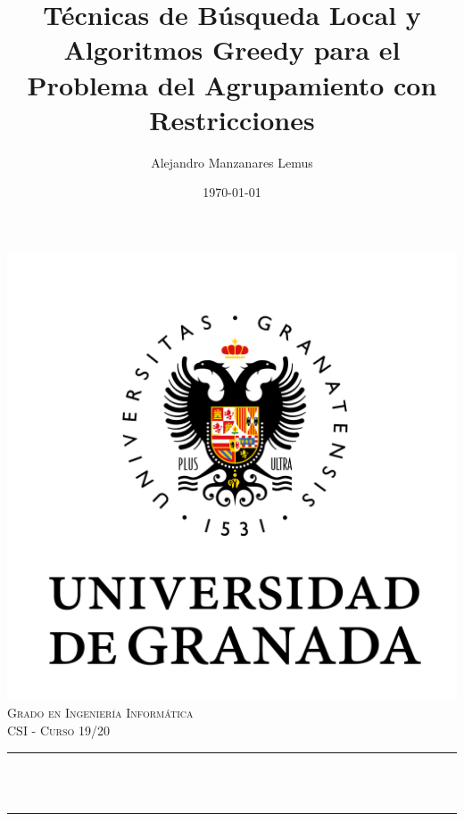 \documentclass[12pt, spanish]{article}
\title{Técnicas de Búsqueda Local y Algoritmos Greedy para el Problema del Agrupamiento con Restricciones}
\author{Alejandro Manzanares Lemus }
\date{\today}
\makeatletter
\let\thetitle\@title
\makeatother
\begin{document}
\begin{titlepage}
    \centering
    \vspace*{0.5 cm}
    \includegraphics[scale = 0.5]{UGR.png}\\[1.0 cm]
    \textsc{\large Grado en Ingeniería Informática}\\[0.5 cm]
    \textsc{\large  CSI - Curso 19/20}\\[0.5 cm]
   \rule{\linewidth}{0.0 mm} \\[0.4 cm]
    { \Large \bfseries \thetitle}\\
    \rule{\linewidth}{0.0 mm} \\[1.5 cm]


\end{titlepage}
\end{document}
